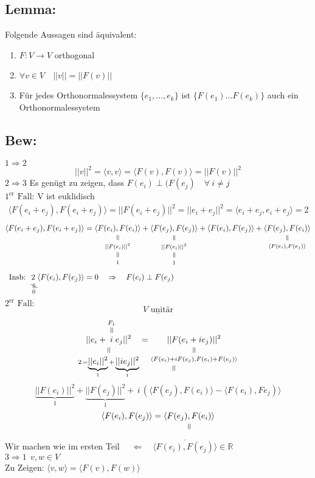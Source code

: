 \documentclass[titlepage,12pt,a4paper,ngerman]{report}
\newcommand{\verteq}{\rotatebox{90}{$\,=$}}
\newcommand{\equalto}[2]{\underset{\scriptstyle\overset{\mkern4mu\verteq}{#2}}{#1}}
\newcommand{\equaltoup}[2]{\overset{\scriptstyle\underset{\mkern4mu\verteq}{#2}}{#1}}
\newcommand{\custo}[3]{\underset{\scriptstyle\overset{\mkern4mu\rotatebox{-90}{$\,#1$}}{#3}}{#2}}
\newcommand{\tx}[1]{\textrm{#1}}
\newcommand{\basis}[3]{\{#1_{#2}, \dots, #1_{#3}\}}
\newcommand{\ska}[2]{\langle #1 , #2 \rangle}
\begin{document}
\subsection{Lemma:}
Folgende Aussagen sind äquivalent: 
\begin{enumerate}[1.)]
	\item $F:V \to V $ orthogonal
	\item $\forall v \in V \quad ||v|| = ||F(v)||$
	\item Für jedes Orthonormalessystem $\basis{e}{1}{k}$ ist $\{F(e_1) \dots F(e_k)\}$ auch ein Orthonormalessystem
\end{enumerate}

\subsection{Bew:}
$ \boxed{1 \Rightarrow 2} $ 
$$ ||v||^2 = \ska{v}{v} = \ska{F(v)}{F(v)} = ||F(v)||^2$$
$ \boxed{2 \Rightarrow 3} $ Es genügt zu zeigen, dass $ F(e_i) \perp (F(e_j) \quad \forall\ i \neq j $\\
$ \boxed{1^{\tx{er}}\tx{ Fall:}} $ V ist euklidisch
\begin{align*}
\ska{F(e_i + e_j)}{F(e_i + e_j)} = || F(e_i + e_j) ||^2 = ||e_i + e_j ||^2 = \ska{e_i + e_j}{e_i + e_j} = 2
\end{align*}
\begin{align*}
\ska{F(e_i + e_j)}{F(e_i + e_j)} &= \equalto{\ska{F(e_i)}{F(e_i)}}{\equalto{||F(e_i)||^2}{1}} + \equalto{\ska{F(e_j)}{F(e_j)}}{\equalto{||F(e_i)||^2}{1}} + \ska{F(e_i)}{F(e_j)} + \equalto{\ska{F(e_j)}{F(e_i)}}{\ska{F(e_i)}{F(e_j)}}\\[5pt]
\tx{Insb: } \custo{\neq}{2}{\, 0} \ska{F(e_i)}{F(e_j)} &= 0 \quad \Rightarrow \quad F(e_i) \perp F(e_j) 
\end{align*}
$\boxed{2^{\tx{er}} \tx{ Fall:}}$
$$\underline{V \tx{ unitär}}$$
$$\equalto{||e_i + \equaltoup{i}{F_1} e_j ||^2}{2\,  = \underbrace{||e_i||^2}_{1} + \underbrace{||ie_j||^2}_{1}} = \equalto{||F(e_i + ie_j)||^2}{\ska{\equalto{F(e_i) + i F(e_j)}{}}{F(e_i) + F(e_j)}}$$
$$\underbrace{||F(e_i)||^2}_{1} + \underbrace{||F(e_j)||^2}_{1} +\,  i\,  (\ska{F(e_j)}{F(e_i)}-\ska{F(e_i)}{Fe_j)}$$
$$\ska{F(e_i)}{F(e_j)} = \equalto{\ska{F(e_j)}{F(e_i)}}{}$$
Wir machen wie im ersten Teil $\quad \Leftarrow \quad \overline{\ska{F(e_i)}{F(e_j)}} \in \mathbb R$\\[10pt]
$ \boxed{3 \Rightarrow 1}  \ \ v,w \in V$\\
Zu Zeigen: $ \ska{v}{w} = \ska{F(v)}{F(w)} $\\
\end{document}
